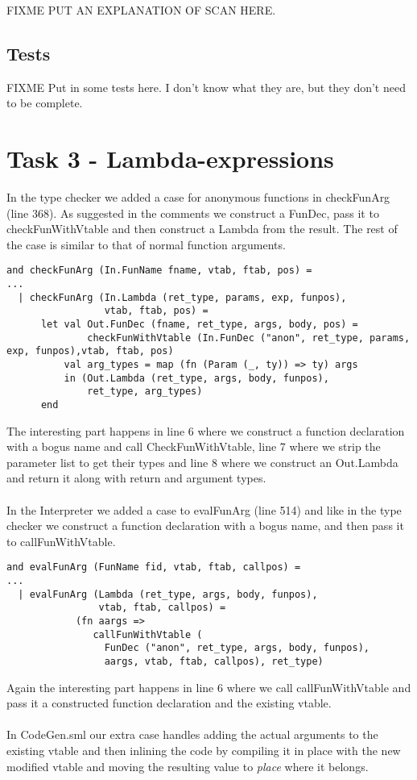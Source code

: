 \documentclass{article}
\begin{document}
\noindent FIXME PUT AN EXPLANATION OF SCAN HERE.

\subsection{Tests}

FIXME Put in some tests here. I don't know what they are, but they don't need to be complete.

\newpage

\section{Task 3 - Lambda-expressions}
In the type checker we added a case for anonymous functions in checkFunArg (line 368). As suggested in the comments we construct a FunDec, pass it to checkFunWithVtable and then construct a Lambda from the result. The rest of the case is similar to that of normal function arguments.
\begin{lstlisting}
and checkFunArg (In.FunName fname, vtab, ftab, pos) =
...
  | checkFunArg (In.Lambda (ret_type, params, exp, funpos),
                 vtab, ftab, pos) =
      let val Out.FunDec (fname, ret_type, args, body, pos) = 
              checkFunWithVtable (In.FunDec ("anon", ret_type, params, exp, funpos),vtab, ftab, pos)
          val arg_types = map (fn (Param (_, ty)) => ty) args
          in (Out.Lambda (ret_type, args, body, funpos),
              ret_type, arg_types)
      end
\end{lstlisting}
\noindent The interesting part happens in line 6 where we construct a function declaration with a bogus name and call CheckFunWithVtable, line 7 where we strip the parameter list to get their types and line 8 where we construct an Out.Lambda and return it along with return and argument types.\\
\\
\noindent In the Interpreter we added a case to evalFunArg (line 514) and like in the type checker we construct a function declaration with a bogus name, and then pass it to callFunWithVtable.
\begin{lstlisting}
and evalFunArg (FunName fid, vtab, ftab, callpos) =
...
  | evalFunArg (Lambda (ret_type, args, body, funpos),
                vtab, ftab, callpos) =
            (fn aargs =>
               callFunWithVtable (
                 FunDec ("anon", ret_type, args, body, funpos),
                 aargs, vtab, ftab, callpos), ret_type)
\end{lstlisting}
\noindent Again the interesting part happens in line 6 where we call callFunWithVtable and pass it a constructed function declaration and the existing vtable.\\
\\
\noindent In CodeGen.sml our extra case handles adding the actual arguments to the existing vtable and then inlining the code by compiling it in place with the new modified vtable and moving the resulting value to \textit{place} where it belongs.
\end{document}

